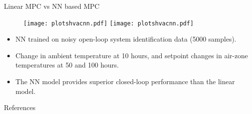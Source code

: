 \documentclass[xcolor=dvipsnames, 8pt]{beamer} %
\begin{document}
\begin{frame}{Linear MPC vs NN based MPC}
	\begin{figure}[!h]
		\centering
		\texttt{[image: plotshvacnn.pdf]} \hfill
		\texttt{[image: plotshvacnn.pdf]}
	\end{figure}
	
	\begin{itemize}
		\item NN trained on noisy open-loop system identification data (5000 samples).
		\item Change in ambient temperature at 10 hours, and setpoint changes in air-zone 
		temperatures at 50 and 100 hours. 
		\item The NN model provides superior closed-loop performance than the linear model.
	\end{itemize}
\end{frame}

	\begin{frame}{References}


\end{frame}
\end{document}
